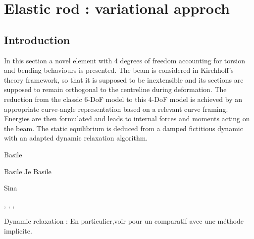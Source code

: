 \chapter{Elastic rod : variational approch}

\section{Introduction}

In this section a novel element with 4 degrees of freedom accounting for torsion and bending behaviours is presented. The beam is considered in Kirchhoff's theory framework, so that it is supposed to be inextensible and its sections are supposed to remain orthogonal to the centreline during deformation. The reduction from the classic 6-DoF model to this 4-DoF model is achieved by an appropriate curve-angle representation based on a relevant curve framing. Energies are then formulated and leads to internal forces and moments acting on the beam. The static equilibrium is deduced from a damped fictitious dynamic with an adapted dynamic relaxation algorithm.

Basile \cite{Bergou2010}

Basile \cite{Bergou2008}
Je
Basile \cite{Audoly2000}

Sina \cite{Nabei2014}

\cite{Fuller1978}, \cite{deVries2005},  \cite{Vauquelin2000}, \cite{Berger2009}

Dynamic relaxation :
\cite{Lewis2003}
En particulier,voir pour un comparatif avec une méthode implicite.




